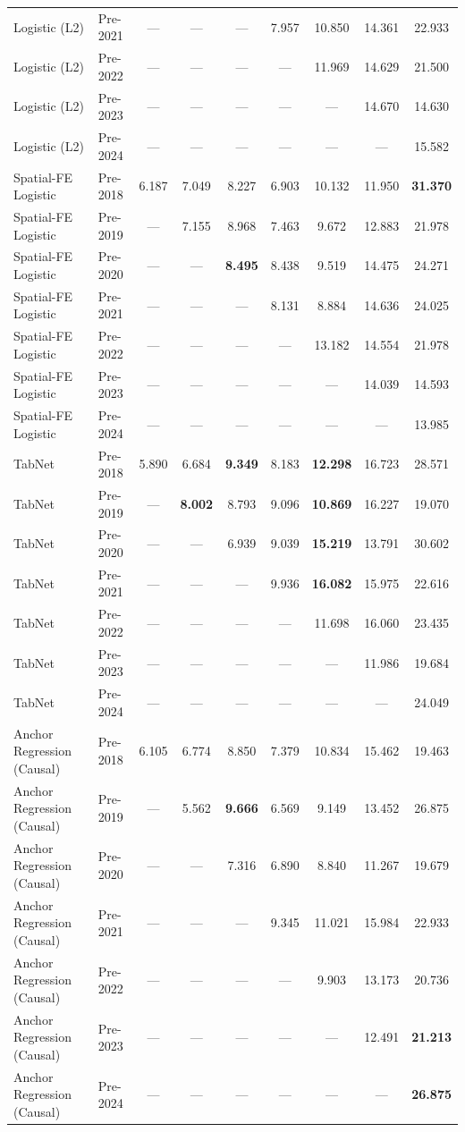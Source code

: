 \begin{table}[htbp]
{\begin{tabular}{l lccccccc}
Logistic (L2) & Pre-2021 & --- & --- & --- & 7.957 & 10.850 & 14.361 & 22.933 \\
Logistic (L2) & Pre-2022 & --- & --- & --- & --- & 11.969 & 14.629 & 21.500 \\
Logistic (L2) & Pre-2023 & --- & --- & --- & --- & --- & 14.670 & 14.630 \\
Logistic (L2) & Pre-2024 & --- & --- & --- & --- & --- & --- & 15.582 \\
Spatial-FE Logistic & Pre-2018 & 6.187 & 7.049 & 8.227 & 6.903 & 10.132 & 11.950 & \textbf{31.370} \\
Spatial-FE Logistic & Pre-2019 & --- & 7.155 & 8.968 & 7.463 & 9.672 & 12.883 & 21.978 \\
Spatial-FE Logistic & Pre-2020 & --- & --- & \textbf{8.495} & 8.438 & 9.519 & 14.475 & 24.271 \\
Spatial-FE Logistic & Pre-2021 & --- & --- & --- & 8.131 & 8.884 & 14.636 & 24.025 \\
Spatial-FE Logistic & Pre-2022 & --- & --- & --- & --- & 13.182 & 14.554 & 21.978 \\
Spatial-FE Logistic & Pre-2023 & --- & --- & --- & --- & --- & 14.039 & 14.593 \\
Spatial-FE Logistic & Pre-2024 & --- & --- & --- & --- & --- & --- & 13.985 \\
TabNet & Pre-2018 & 5.890 & 6.684 & \textbf{9.349} & 8.183 & \textbf{12.298} & 16.723 & 28.571 \\
TabNet & Pre-2019 & --- & \textbf{8.002} & 8.793 & 9.096 & \textbf{10.869} & 16.227 & 19.070 \\
TabNet & Pre-2020 & --- & --- & 6.939 & 9.039 & \textbf{15.219} & 13.791 & 30.602 \\
TabNet & Pre-2021 & --- & --- & --- & 9.936 & \textbf{16.082} & 15.975 & 22.616 \\
TabNet & Pre-2022 & --- & --- & --- & --- & 11.698 & 16.060 & 23.435 \\
TabNet & Pre-2023 & --- & --- & --- & --- & --- & 11.986 & 19.684 \\
TabNet & Pre-2024 & --- & --- & --- & --- & --- & --- & 24.049 \\
Anchor Regression (Causal) & Pre-2018 & 6.105 & 6.774 & 8.850 & 7.379 & 10.834 & 15.462 & 19.463 \\
Anchor Regression (Causal) & Pre-2019 & --- & 5.562 & \textbf{9.666} & 6.569 & 9.149 & 13.452 & 26.875 \\
Anchor Regression (Causal) & Pre-2020 & --- & --- & 7.316 & 6.890 & 8.840 & 11.267 & 19.679 \\
Anchor Regression (Causal) & Pre-2021 & --- & --- & --- & 9.345 & 11.021 & 15.984 & 22.933 \\
Anchor Regression (Causal) & Pre-2022 & --- & --- & --- & --- & 9.903 & 13.173 & 20.736 \\
Anchor Regression (Causal) & Pre-2023 & --- & --- & --- & --- & --- & 12.491 & \textbf{21.213} \\
Anchor Regression (Causal) & Pre-2024 & --- & --- & --- & --- & --- & --- & \textbf{26.875} \\
\bottomrule
\end{tabular}%
}
\end{table}
